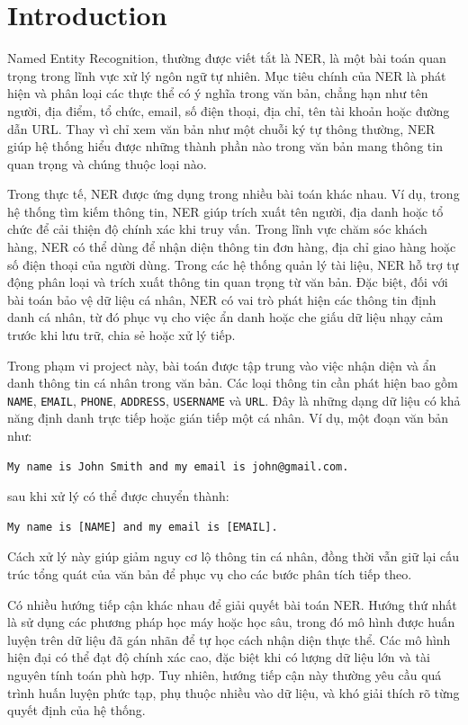 \section{Introduction}

Named Entity Recognition, thường được viết tắt là NER, là một bài toán quan trọng trong lĩnh vực xử lý ngôn ngữ tự nhiên. Mục tiêu chính của NER là phát hiện và phân loại các thực thể có ý nghĩa trong văn bản, chẳng hạn như tên người, địa điểm, tổ chức, email, số điện thoại, địa chỉ, tên tài khoản hoặc đường dẫn URL. Thay vì chỉ xem văn bản như một chuỗi ký tự thông thường, NER giúp hệ thống hiểu được những thành phần nào trong văn bản mang thông tin quan trọng và chúng thuộc loại nào.

Trong thực tế, NER được ứng dụng trong nhiều bài toán khác nhau. Ví dụ, trong hệ thống tìm kiếm thông tin, NER giúp trích xuất tên người, địa danh hoặc tổ chức để cải thiện độ chính xác khi truy vấn. Trong lĩnh vực chăm sóc khách hàng, NER có thể dùng để nhận diện thông tin đơn hàng, địa chỉ giao hàng hoặc số điện thoại của người dùng. Trong các hệ thống quản lý tài liệu, NER hỗ trợ tự động phân loại và trích xuất thông tin quan trọng từ văn bản. Đặc biệt, đối với bài toán bảo vệ dữ liệu cá nhân, NER có vai trò phát hiện các thông tin định danh cá nhân, từ đó phục vụ cho việc ẩn danh hoặc che giấu dữ liệu nhạy cảm trước khi lưu trữ, chia sẻ hoặc xử lý tiếp.

Trong phạm vi project này, bài toán được tập trung vào việc nhận diện và ẩn danh thông tin cá nhân trong văn bản. Các loại thông tin cần phát hiện bao gồm \texttt{NAME}, \texttt{EMAIL}, \texttt{PHONE}, \texttt{ADDRESS}, \texttt{USERNAME} và \texttt{URL}. Đây là những dạng dữ liệu có khả năng định danh trực tiếp hoặc gián tiếp một cá nhân. Ví dụ, một đoạn văn bản như:

\begin{verbatim}
My name is John Smith and my email is john@gmail.com.
\end{verbatim}

sau khi xử lý có thể được chuyển thành:

\begin{verbatim}
My name is [NAME] and my email is [EMAIL].
\end{verbatim}

Cách xử lý này giúp giảm nguy cơ lộ thông tin cá nhân, đồng thời vẫn giữ lại cấu trúc tổng quát của văn bản để phục vụ cho các bước phân tích tiếp theo.

Có nhiều hướng tiếp cận khác nhau để giải quyết bài toán NER. Hướng thứ nhất là sử dụng các phương pháp học máy hoặc học sâu, trong đó mô hình được huấn luyện trên dữ liệu đã gán nhãn để tự học cách nhận diện thực thể. Các mô hình hiện đại có thể đạt độ chính xác cao, đặc biệt khi có lượng dữ liệu lớn và tài nguyên tính toán phù hợp. Tuy nhiên, hướng tiếp cận này thường yêu cầu quá trình huấn luyện phức tạp, phụ thuộc nhiều vào dữ liệu, và khó giải thích rõ từng quyết định của hệ thống.

